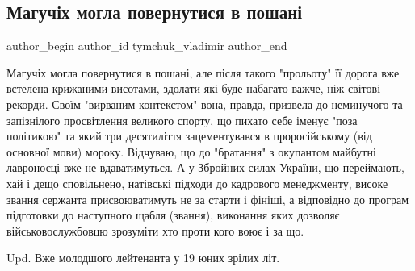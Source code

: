  
 
 
 
 
 
\subsection{Магучіх могла повернутися в пошані}
\label{sec:08_08_2021.fb.tymchuk_vladimir.1.maguchih}
 
\ifcmt
 author_begin
   author_id tymchuk_vladimir
 author_end
\fi

Магучіх могла повернутися в пошані, але після такого "прольоту" її дорога вже
встелена крижаними висотами, здолати які буде набагато важче, ніж світові
рекорди. Своїм "вирваним контекстом" вона, правда, призвела до неминучого та
запізнілого просвітлення великого спорту, що пихато себе іменує "поза
політикою" та який три десятиліття зацементувався в проросійському (від
основної мови) мороку. Відчуваю, що до "братання" з окупантом майбутні
лавроносці вже не вдаватимуться. А у Збройних силах України, що переймають, хай
і дещо сповільнено, натівські підходи до кадрового менеджменту, високе звання
сержанта присвоюватимуть не за старти і фініші, а відповідно до програм
підготовки до наступного щабля (звання), виконання яких дозволяє
військовослужбовцю зрозуміти хто проти кого воює і за що.

Upd. Вже молодшого лейтенанта у 19 юних зрілих літ.
